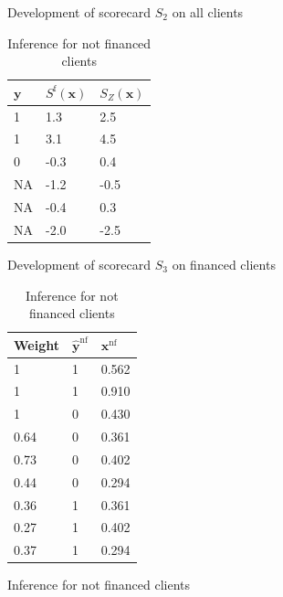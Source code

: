 \begin{table}
{\begin{multicols}{4}
\begin{subfigure}[t]{0.22\textwidth}
\caption{Development of scorecard $S_2$ on all clients}
\label{twins:sfig2}
\end{subfigure}

\columnbreak

\begin{subfigure}[t]{0.22\textwidth}
\begin{center}
\begin{adjustbox}{max width=0.95\textwidth}
\begin{tabular}{l l l}
\toprule
\textbf{${\bm{y}}$} & \textbf{$S^{\text{f}}({\bm{x}})$} & \textbf{$S_Z({\bm{x}})$}\\
\midrule
1 & 1.3 & 2.5\\
1 & 3.1 & 4.5 \\
0 & -0.3 & 0.4 \\
NA & -1.2 & -0.5 \\
NA & -0.4 & 0.3 \\
NA & -2.0 & -2.5 \\
\bottomrule
\end{tabular}
\end{adjustbox}
\end{center}

\caption{Development of scorecard $S_3$ on financed clients}
\label{twins:sfig3}
\end{subfigure}

\columnbreak

\begin{subfigure}[t]{0.22\textwidth}
\begin{center}
\begin{adjustbox}{max width=0.95\textwidth}
\begin{tabular}{l l l}
\toprule
\textbf{Weight} & \textbf{$\hat{\bm{y}}^{\text{nf}}$} & \textbf{${\bm{x}}^{\text{nf}}$}\\
\midrule
1 & 1 & 0.562 \\
1 & 1 & 0.910 \\
1 & 0 & 0.430 \\
0.64 & 0 & 0.361 \\
0.73 & 0 & 0.402 \\
0.44 & 0 & 0.294 \\
0.36 & 1 & 0.361 \\
0.27 & 1 & 0.402 \\
0.37 & 1 & 0.294 \\
\bottomrule
\end{tabular}
\end{adjustbox}
\end{center}

\caption{Inference for not financed clients}
\label{twins:sfig4}
\end{subfigure}

\end{multicols}
}
\end{table}



